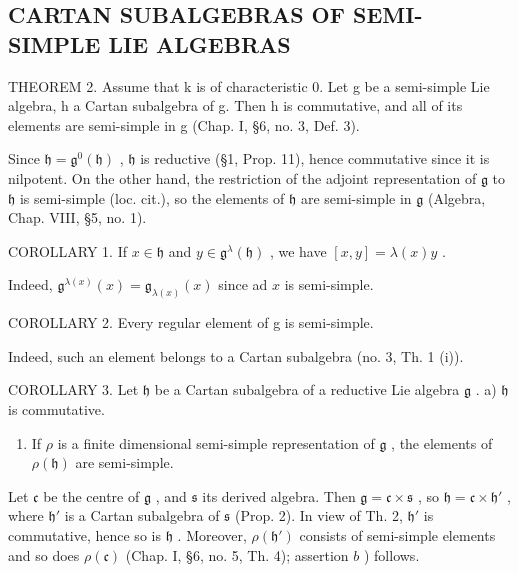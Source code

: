 \subsection{CARTAN SUBALGEBRAS OF SEMI-SIMPLE LIE ALGEBRAS}

THEOREM 2. Assume that k is of characteristic 0. Let g be a semi-simple Lie algebra, h a Cartan subalgebra of g. Then h is commutative, and all of its elements are semi-simple in g (Chap. I, §6, no. 3, Def. 3).

Since \(\mathfrak{h} = \mathfrak{g}^0 (\mathfrak{h})\) , \(\mathfrak{h}\) is reductive (§1, Prop. 11), hence commutative since it is nilpotent. On the other hand, the restriction of the adjoint representation of \(\mathfrak{g}\) to \(\mathfrak{h}\) is semi-simple (loc. cit.), so the elements of \(\mathfrak{h}\) are semi-simple in \(\mathfrak{g}\) (Algebra, Chap. VIII, §5, no. 1).

COROLLARY 1. If \(x \in \mathfrak{h}\) and \(y \in \mathfrak{g}^{\lambda}(\mathfrak{h})\) , we have \([x, y] = \lambda(x)y\) .

Indeed, \(\mathfrak{g}^{\lambda (x)}(x) = \mathfrak{g}_{\lambda (x)}(x)\) since ad \(x\) is semi-simple.

COROLLARY 2. Every regular element of g is semi-simple.

Indeed, such an element belongs to a Cartan subalgebra (no. 3, Th. 1 (i)).

COROLLARY 3. Let \(\mathfrak{h}\) be a Cartan subalgebra of a reductive Lie algebra \(\mathfrak{g}\) . a) \(\mathfrak{h}\) is commutative.

\begin{enumerate}
\def\labelenumi{\alph{enumi})}
\setcounter{enumi}{1}
\tightlist
\item
  If \(\rho\) is a finite dimensional semi-simple representation of \(\mathfrak{g}\) , the elements of \(\rho(\mathfrak{h})\) are semi-simple.
\end{enumerate}

Let \(\mathfrak{c}\) be the centre of \(\mathfrak{g}\) , and \(\mathfrak{s}\) its derived algebra. Then \(\mathfrak{g} = \mathfrak{c} \times \mathfrak{s}\) , so \(\mathfrak{h} = \mathfrak{c} \times \mathfrak{h}'\) , where \(\mathfrak{h}'\) is a Cartan subalgebra of \(\mathfrak{s}\) (Prop. 2). In view of Th. 2, \(\mathfrak{h}'\) is commutative, hence so is \(\mathfrak{h}\) . Moreover, \(\rho(\mathfrak{h}')\) consists of semi-simple elements and so does \(\rho(\mathfrak{c})\) (Chap. I, §6, no. 5, Th. 4); assertion \(b\) ) follows.

